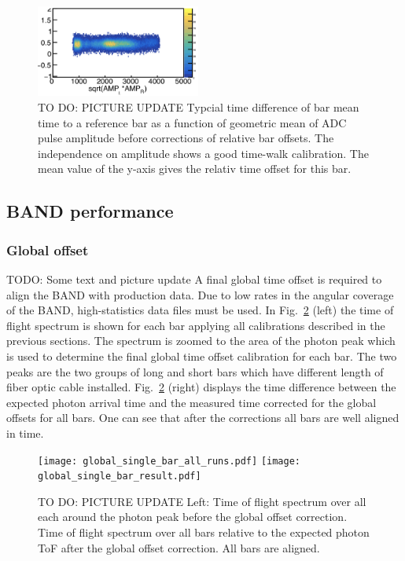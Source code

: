 \documentclass[3p,final,twocolumn]{elsarticle}
\begin{document}
\begin{figure}[tbh!]
	\centering
		\includegraphics[width=0.48\textwidth]{bar_offset.png}
	\caption{TO DO: PICTURE UPDATE Typcial time difference of bar mean time to a reference bar as a function of geometric mean of ADC pulse amplitude before corrections of relative bar offsets. The independence on amplitude shows a good time-walk calibration. The mean value of the y-axis gives the relativ time offset for this bar.}
	\label{fig:bar_off}
\end{figure}

\subsection{BAND performance} 
\subsubsection{Global offset}
\label{sec:global_offset}
{\color{red} TODO: Some text and picture update}
A final global time offset is required to align the BAND with production data. Due to low rates in the angular coverage of the BAND, 
high-statistics data files must be used. 
In Fig.~\ref{fig:final_offset} (left) the time of flight spectrum is shown for each bar applying all calibrations described in the previous sections. The spectrum is zoomed to the area of the photon peak which is used to determine the final global time offset calibration for each bar. The two peaks are the two groups of long and short bars which have different length of fiber optic cable installed. Fig.~\ref{fig:final_offset} (right) displays the time difference between the expected photon arrival time and the measured time corrected for the global offsets for all bars. One can see that after the corrections all bars are well aligned in time.
\begin{figure}[tb]
	\centering
		\texttt{[image: global\_single\_bar\_all\_runs.pdf]}
		\texttt{[image: global\_single\_bar\_result.pdf]}
	\caption{TO DO: PICTURE UPDATE Left: Time of flight spectrum over all each around the photon peak before the global offset correction. Time of flight spectrum over all bars relative to the expected photon ToF after  the global offset correction. All bars are aligned.}
	\label{fig:final_offset}
\end{figure}
\end{document}
